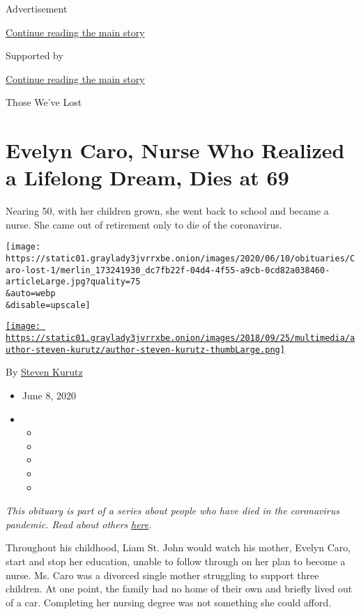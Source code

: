 Advertisement

\protect\hyperlink{after-top}{Continue reading the main story}

Supported by

\protect\hyperlink{after-sponsor}{Continue reading the main story}

Those We've Lost

\hypertarget{evelyn-caro-nurse-who-realized-a-lifelong-dream-dies-at-69}{%
\section{Evelyn Caro, Nurse Who Realized a Lifelong Dream, Dies at
69}\label{evelyn-caro-nurse-who-realized-a-lifelong-dream-dies-at-69}}

Nearing 50, with her children grown, she went back to school and became
a nurse. She came out of retirement only to die of the coronavirus.

\texttt{[image: https://static01.graylady3jvrrxbe.onion/images/2020/06/10/obituaries/Caro-lost-1/merlin\_173241930\_dc7fb22f-04d4-4f55-a9cb-0cd82a038460-articleLarge.jpg?quality=75\\\&auto=webp\\\&disable=upscale]}

\href{https://www.nytimes3xbfgragh.onion/by/steven-kurutz}{\texttt{[image: https://static01.graylady3jvrrxbe.onion/images/2018/09/25/multimedia/author-steven-kurutz/author-steven-kurutz-thumbLarge.png]}}

By \href{https://www.nytimes3xbfgragh.onion/by/steven-kurutz}{Steven
Kurutz}

\begin{itemize}
\item
  June 8, 2020
\item
  \begin{itemize}
  \item
  \item
  \item
  \item
  \item
  \end{itemize}
\end{itemize}

\emph{This obituary is part of a series about people who have died in
the coronavirus pandemic. Read about others}
\href{https://www.nytimes3xbfgragh.onion/interactive/2020/obituaries/people-died-coronavirus-obituaries.html}{\emph{here}}\emph{.}

Throughout his childhood, Liam St. John would watch his mother, Evelyn
Caro, start and stop her education, unable to follow through on her plan
to become a nurse. Ms. Caro was a divorced single mother struggling to
support three children. At one point, the family had no home of their
own and briefly lived out of a car. Completing her nursing degree was
not something she could afford.

